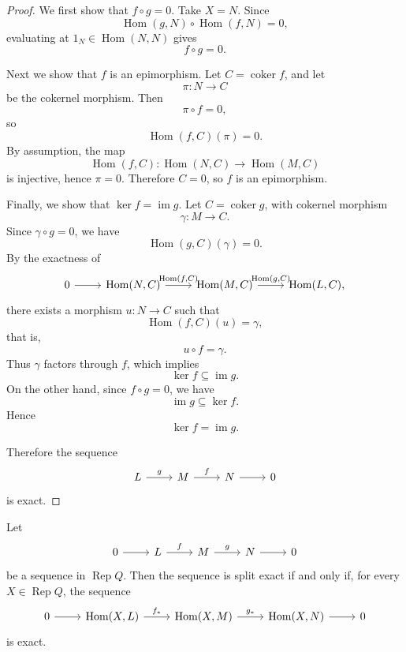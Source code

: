 \documentclass[11pt, a4paper]{report}
\begin{document}
\begin{proof}
    We first show that $f\circ g=0$. Take $X=N$. Since
    \[
        \operatorname{Hom}(g,N)\circ \operatorname{Hom}(f,N)=0,
    \]
    evaluating at $1_N \in \operatorname{Hom}(N,N)$ gives
    \[
        f\circ g=0.
    \]

    Next we show that $f$ is an epimorphism. Let $C=\operatorname{coker}f$, and let
    \[
        \pi:N\to C
    \]
    be the cokernel morphism. Then
    \[
        \pi\circ f=0,
    \]
    so
    \[
        \operatorname{Hom}(f,C)(\pi)=0.
    \]
    By assumption, the map
    \[
        \operatorname{Hom}(f,C):\operatorname{Hom}(N,C)\to \operatorname{Hom}(M,C)
    \]
    is injective, hence $\pi=0$. Therefore $C=0$, so $f$ is an epimorphism.

    Finally, we show that $\ker f=\operatorname{im}g$. Let $C=\operatorname{coker}g$, with cokernel morphism
    \[
        \gamma:M\to C.
    \]
    Since $\gamma\circ g=0$, we have
    \[
        \operatorname{Hom}(g,C)(\gamma)=0.
    \]
    By the exactness of
    \[
        \begin{tikzcd}
            0 \arrow[r] & {\operatorname{Hom}(N,C)} \arrow[r,"{\operatorname{Hom}(f,C)}"] &
            {\operatorname{Hom}(M,C)} \arrow[r,"{\operatorname{Hom}(g,C)}"] &
            {\operatorname{Hom}(L,C)},
        \end{tikzcd}
    \]
    there exists a morphism $u:N\to C$ such that
    \[
        \operatorname{Hom}(f,C)(u)=\gamma,
    \]
    that is,
    \[
        u\circ f=\gamma.
    \]
    Thus $\gamma$ factors through $f$, which implies
    \[
        \ker f \subseteq \operatorname{im}g.
    \]
    On the other hand, since $f\circ g=0$, we have
    \[
        \operatorname{im}g \subseteq \ker f.
    \]
    Hence
    \[
        \ker f=\operatorname{im}g.
    \]

    Therefore the sequence
    \[
        \begin{tikzcd}
            L \arrow[r,"g"] & M \arrow[r,"f"] & N \arrow[r] & 0
        \end{tikzcd}
    \]
    is exact.
\end{proof}

\begin{corollary}
    Let
    \[
        \begin{tikzcd}
            0 \arrow[r] & L \arrow[r,"f"] & M \arrow[r,"g"] & N \arrow[r] & 0
        \end{tikzcd}
    \]
    be a sequence in $\operatorname{Rep}Q$. Then the sequence is split exact if and only if, for every $X \in \operatorname{Rep}Q$, the sequence
    \[
        \begin{tikzcd}
            0 \arrow[r] & \operatorname{Hom}(X,L) \arrow[r,"f_*"] &
            \operatorname{Hom}(X,M) \arrow[r,"g_*"] &
            \operatorname{Hom}(X,N) \arrow[r] & 0
        \end{tikzcd}
    \]
    is exact.
\end{corollary}
\end{document}
